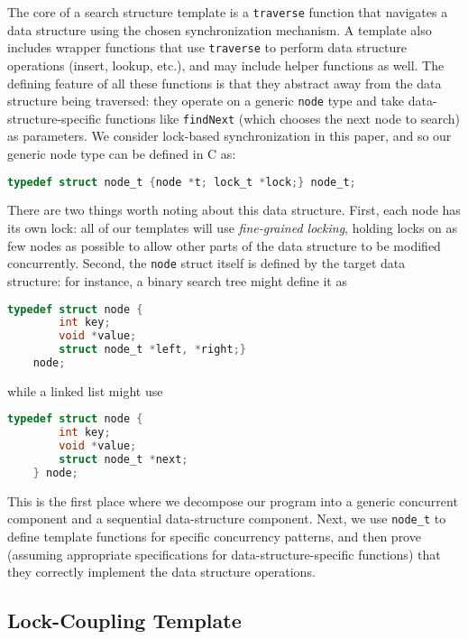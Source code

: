 \documentclass[sigplan,10pt,anonymous,review]{acmart}\settopmatter{printfolios=true,printccs=false,printacmref=false}
\begin{document}
The core of a search structure template is a \lstinline{traverse} function that navigates a data structure using the chosen synchronization mechanism. A template also includes wrapper functions that use \lstinline{traverse} to perform data structure operations (insert, lookup, etc.), and may include helper functions as well. The defining feature of all these functions is that they abstract away from the data structure being traversed: they operate on a generic \lstinline{node} type and take data-structure-specific functions like \lstinline{findNext} (which chooses the next node to search) as parameters. We consider lock-based synchronization in this paper, and so our generic node type can be defined in C as:
\begin{lstlisting}[language = C, backgroundcolor=\color{white}, basicstyle=\ttfamily\footnotesize, xleftmargin=-2.07em]
	typedef struct node_t {node *t; lock_t *lock;} node_t;
\end{lstlisting}
There are two things worth noting about this data structure. First, each node has its own lock: all of our templates will use \emph{fine-grained locking}, holding locks on as few nodes as possible to allow other parts of the data structure to be modified concurrently. Second, the \lstinline{node} struct itself is defined by the target data structure: for instance, a binary search tree might define it as 
\begin{lstlisting}[language = C, backgroundcolor=\color{white}, basicstyle=\ttfamily\footnotesize, xleftmargin=-2.07em]
	typedef struct node {
		int key; 
		void *value; 
		struct node_t *left, *right;} 
	node;
\end{lstlisting}
while a linked list might use
\begin{lstlisting}[language = C, backgroundcolor=\color{white}, basicstyle=\ttfamily\footnotesize, xleftmargin=-2.07em]
	typedef struct node {
		int key; 
		void *value; 
		struct node_t *next;
	} node;
\end{lstlisting}
This is the first place where we decompose our program into a generic concurrent component and a sequential data-structure component. Next, we use \lstinline{node_t} to define template functions for specific concurrency patterns, and then prove (assuming appropriate specifications for data-structure-specific functions) that they correctly implement the data structure operations.

\subsection{Lock-Coupling Template}
\label{lock-coupling-algo}
\end{document}
